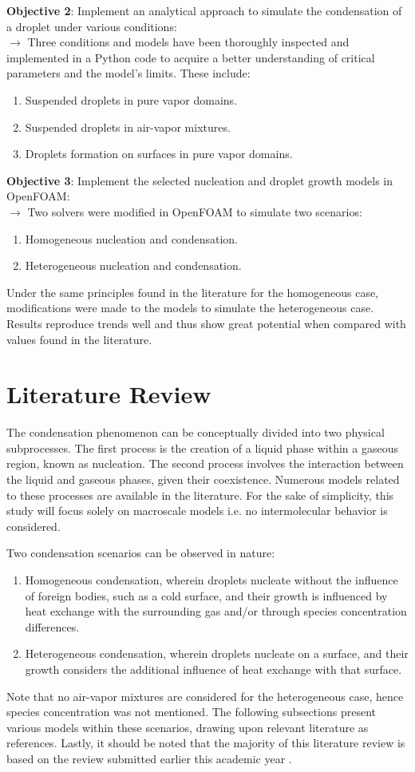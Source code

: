 \documentclass[12pt]{article}
\numberwithin{equation}{section}
\begin{document}
\noindent
\textbf{Objective 2}: Implement an analytical approach to simulate the condensation of a droplet under various conditions:\\
$\rightarrow$ Three conditions and models have been thoroughly inspected and implemented in a Python code to acquire a better understanding of critical parameters and the model's limits. These include:
\begin{enumerate}
    \item Suspended droplets in pure vapor domains.
    \item Suspended droplets in air-vapor mixtures.
    \item Droplets formation on surfaces in pure vapor domains.
\end{enumerate} 
\textbf{Objective 3}: Implement the selected nucleation and droplet growth models in OpenFOAM:\\
$\rightarrow$ Two solvers were modified in OpenFOAM to simulate two scenarios:
\begin{enumerate}
    \item Homogeneous nucleation and condensation. 
    \item Heterogeneous nucleation and condensation.
\end{enumerate}
Under the same principles found in the literature for the homogeneous case, modifications were made to the models to simulate the heterogeneous case. Results reproduce trends well and thus show great potential when compared with values found in the literature. 
\newpage
\section{Literature Review }\label{s:Literature}
The condensation phenomenon can be conceptually divided into two physical subprocesses. The first process is the creation of a liquid phase within a gaseous region, known as nucleation. The second process involves the interaction between the liquid and gaseous phases, given their coexistence. Numerous models related to these processes are available in the literature. For the sake of simplicity, this study will focus solely on macroscale models i.e. no intermolecular behavior is considered.

Two condensation scenarios can be observed in nature:
\begin{enumerate}
    \item Homogeneous condensation, wherein droplets nucleate without the influence of foreign bodies, such as a cold surface, and their growth is influenced by heat exchange with the surrounding gas and/or through species concentration differences.
    \item Heterogeneous condensation, wherein droplets nucleate on a surface, and their growth considers the additional influence of heat exchange with that surface.
\end{enumerate}
Note that no air-vapor mixtures are considered for the heterogeneous case, hence species concentration was not mentioned.
The following subsections present various models within these scenarios, drawing upon relevant literature as references. Lastly, it should be noted that the majority of this literature review is based on the review submitted earlier this academic year \cite{lit_review}.
\end{document}
